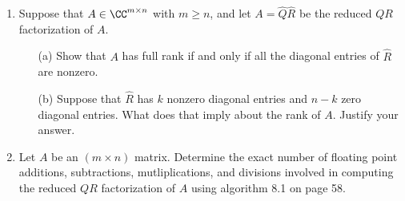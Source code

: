 \documentclass[11pt]{article}
\begin{document}
\begin{enumerate}
    \item %
        Suppose that $A \in \CC^{m \times n}$ with $m \ge n$, and let
        $A = \hat{Q}\hat{R}$ be the reduced $QR$ factorization of $A$.
        \begin{enumerate}
            \item[(a)]
                Show that $A$ has full rank if and only if all the diagonal
                entries of $\hat{R}$ are nonzero.

            \item[(b)]
                Suppose that $\hat{R}$ has $k$ nonzero diagonal entries and
                $n - k$ zero diagonal entries.
                What does that imply about the rank of $A$.
                Justify your answer.
        \end{enumerate}

    \item %
        Let $A$ be an $(m \times n)$ matrix.
        Determine the exact number of floating point additions, subtractions,
        mutliplications, and divisions involved in computing the reduced $QR$
        factorization of $A$ using algorithm 8.1 on page 58.


\end{enumerate}
\end{document}
